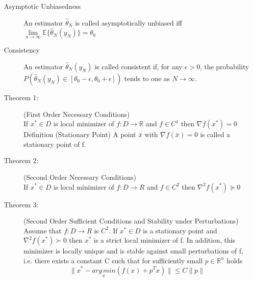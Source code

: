\begin{tcolorbox}[colback=cyan!5!white,colframe=cyan!75!black,title=\textbf{Useful statistic definitions}]
\begin{description}
	\item[\small Asymptotic Unbiasedness]  An estimator $\hat \theta_N$ is called asymptotically unbiased iff $ \lim\limits_{n \to \infty} \mathbb{E}\{\hat \theta_N (y_N) \} = \theta_0$
	
	\item[\small Consistency] An estimator $\hat \theta_N (y_N)$ is called consistent if, for any $\epsilon > 0$, the probability $P(\hat \theta_N (y_N) \in [\theta_0 - \epsilon, \theta_0 + \epsilon])$ tends to one as $N \rightarrow \infty$.
\end{description}
\end{tcolorbox}

\begin{tcolorbox}[colback=blue!5!white,colframe=blue!75!black,title=\textbf{Unconstrainded Optimization}]
\begin{description}
	\item[\small Theorem 1:](First Order Necessary Conditions)\\
		If $x^* \in D$ is local minimizer of $f : D \rightarrow \mathbb{R}$ and $f \in C^1$ then
		$\nabla f (x^*) = 0$
		Definition (Stationary Point) A point $\bar{x}$ with $\nabla f(\bar{x}) = 0$ is called a stationary point of f.
	
	\item[\small Theorem 2:] (Second Order Necessary Conditions)\\
		If $x^* \in D$ is local minimizer of $f : D \rightarrow R$ and $f \in C^2$ then
		$\nabla^2 f(x^*) \succeq 0$
	
	\item[\small Theorem 3:] (Second Order Sufficient Conditions and Stability under Perturbations)\\
		Assume that $f : D \rightarrow R$ is $C^2.$ If $x^* \in D$ is a stationary point and
		$ \nabla^2 f(x^*) \succ 0$
		then $x^*$ is a strict local minimizer of f. In addition, this minimizer is locally unique and is stable against small perturbations of f, i.e. there exists a constant C such that for sufficiently small $p \in \mathbb{R}^n$ holds\\
		\begin{equation*}
		\lVert{x^* - \underset{x}{arg\,min}  (f(x) + p^T x)}\rVert \leq C \lVert p \rVert
		\end{equation*}	
\end{description}
\end{tcolorbox}